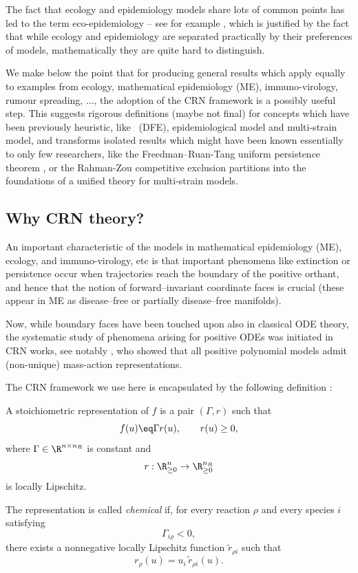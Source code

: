 The fact that  ecology and epidemiology models  share lots of common points has led to the term eco-epidemiology -- see  for  example \cite{BateHil}, which is justified by the fact that while ecology and epidemiology are separated practically by their preferences of models,
mathematically  they are quite hard to distinguish.

  We make below the point that  for producing general results which apply equally to examples from ecology,  mathematical epidemiology (ME), immuno-virology, rumour spreading, ...,  the adoption of the CRN framework is a possibly useful  step.
  This suggests rigorous definitions (maybe not final) for concepts which have been previously heuristic, like \DFE\ (DFE), epidemiological model and multi-strain model, and transforms isolated results which might have been known essentially to only few researchers, like the Freedman--Ruan-Tang uniform persistence theorem \cite{FreRuan}, or  the Rahman-Zou competitive exclusion
partitions \cite{Rahman} into the foundations of a unified theory for multi-strain
models.

\subsection{Why CRN theory?}
An important characteristic of the  models in mathematical epidemiology (ME),
ecology, and immuno-virology, etc is that  important phenomena like extinction or persistence occur
when trajectories reach the boundary of the positive orthant, and hence that the notion
of forward--invariant coordinate faces is crucial (these appear in ME  as disease--free or
partially disease--free manifolds).

Now, while boundary faces have been touched upon also in
classical ODE theory, the systematic study of phenomena arising for
 positive ODEs was initiated in  CRN works, see notably \cite{hun,Erdi}, who showed that
all positive polynomial models admit (non-unique) mass-action representations.



The CRN framework we use here is encapsulated by the following definition \cite{AdLS}:

A stoichiometric representation of $f$ is a pair $(\Gamma,r)$ such that
\[
f(u)\eq\Gamma r(u),
\qquad
r(u)\ge0,
\]
where $\Gamma\in\R^{n\times n_R}$ is constant and
\[
r:\R_{\ge0}^n\to\R_{\ge0}^{n_R}
\]
is locally Lipschitz.

The representation is called \emph{chemical} if, for every reaction
$\rho$ and every species $i$ satisfying
\[
\Gamma_{i\rho}<0,
\]
there exists a nonnegative locally Lipschitz function
$\widetilde r_{\rho i}$ such that
\[
r_\rho(u)
=
u_i\,\widetilde r_{\rho i}(u).
\]

